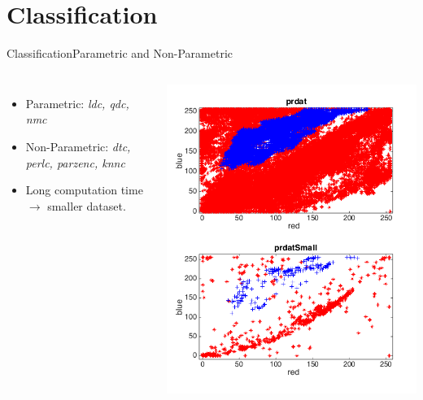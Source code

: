 \documentclass{beamer}
\begin{document}
\section{Classification}

\begin{frame}{Classification}{Parametric and Non-Parametric}
    \begin{columns}
    \begin{itemize}
        \item Parametric: \emph{ldc, qdc, nmc}
        \item Non-Parametric: \emph{dtc, perlc, parzenc, knnc}
        \item Long computation time $\rightarrow$ smaller dataset.
    \end{itemize}
        \includegraphics[scale=0.3]{prdat.png}
    \end{columns}
\end{frame}
\end{document}
